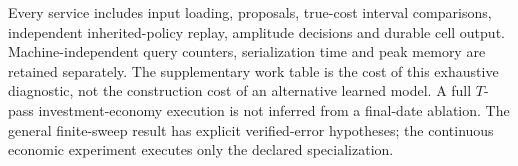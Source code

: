 Every service includes input loading, proposals, true-cost interval comparisons, independent inherited-policy replay, amplitude decisions and durable cell output. Machine-independent query counters, serialization time and peak memory are retained separately. The supplementary work table is the cost of this exhaustive diagnostic, not the construction cost of an alternative learned model. A full $T$-pass investment-economy execution is not inferred from a final-date ablation. The general finite-sweep result has explicit verified-error hypotheses; the continuous economic experiment executes only the declared specialization.
